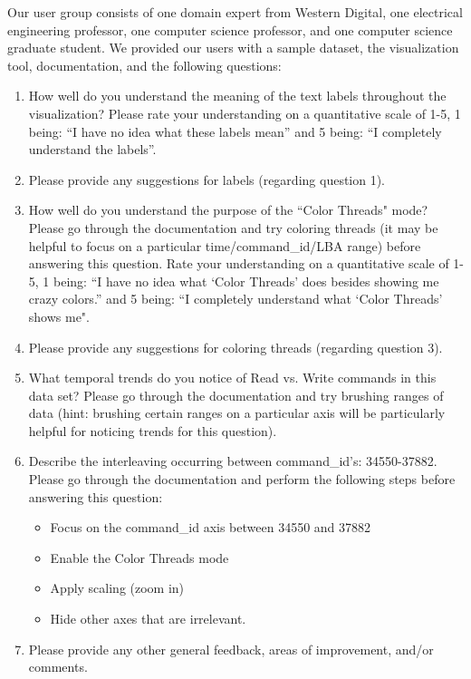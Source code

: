 \documentclass[journal]{vgtc}                %
\begin{document}
Our user group consists of one domain expert from Western Digital, one electrical engineering professor, one computer science professor, and one computer science graduate student. We provided our users with a sample dataset, the visualization tool, documentation, and the following questions:

\begin{enumerate}
\item How well do you understand the meaning of the text labels throughout the visualization? Please rate your understanding on a quantitative scale of 1-5, 1 being: ``I have no idea what these labels mean'' and 5 being: ``I completely understand the labels''.

\item Please provide any suggestions for labels (regarding question 1).

\item How well do you understand the purpose of the ``Color Threads" mode? Please go through the documentation and try coloring threads (it may be helpful to focus on a particular time/command\_id/LBA range) before answering this question. Rate your understanding on a quantitative scale of 1-5, 1 being: ``I have no idea what `Color Threads' does besides showing me crazy colors.'' and 5 being: ``I completely understand what `Color Threads' shows me".

\item Please provide any suggestions for coloring threads (regarding question 3).

\item What temporal trends do you notice of Read vs. Write commands in this data set? Please go through the documentation and try brushing ranges of data (hint: brushing certain ranges on a particular axis will be particularly helpful for noticing trends for this question).

\item Describe the interleaving occurring between command\_id's: 34550-37882. Please go through the documentation and perform the following steps before answering this question: 
\begin{itemize}
\item Focus on the command\_id axis between 34550 and 37882 
\item Enable the Color Threads mode 
\item Apply scaling (zoom in)
\item Hide other axes that are irrelevant.
\end{itemize}

\item Please provide any other general feedback, areas of improvement, and/or comments.

\end{enumerate}
\end{document}

